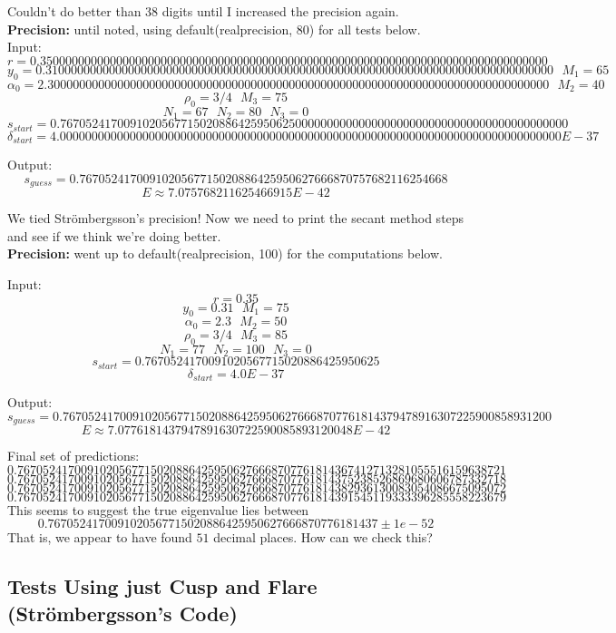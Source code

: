 \documentclass[]{article}
\begin{document}
Couldn't do better than 38 digits until I increased the precision again.
\\

\textbf{Precision:} until noted, using default(realprecision, 80) for all tests below.
\\

Input:
$$
r = 0.35000000000000000000000000000000000000000000000000000000000000000000000000000000 $$$$
y_0 = 0.31000000000000000000000000000000000000000000000000000000000000000000000000000000 ~~~ M_1 = 65 $$$$
\alpha_0 = 2.3000000000000000000000000000000000000000000000000000000000000000000000000000000 ~~~ M_2 = 40 $$$$
\rho_0 = 3/4 ~~~ M_3 = 75 $$$$
N_1 = 67 ~~~ N_2 = 80 ~~~ N_3 = 0 $$$$
s_{start} = 0.76705241700910205677150208864259506250000000000000000000000000000000000000000000 $$$$
\delta_{start} = 4.0000000000000000000000000000000000000000000000000000000000000000000000000000000 E-37
$$

Output:
$$
s_{guess} = 0.7670524170091020567715020886425950627666870757682116254668 $$$$
E \approx 7.075768211625466915 E-42
$$

We tied Str\"ombergsson's precision! Now we need to print the secant method steps and see if we think we're doing better.
\\

\textbf{Precision:} went up to default(realprecision, 100) for the computations below.

Input:
$$
r = 0.35 $$$$
y_0 = 0.31 ~~~ M_1 = 75 $$$$
\alpha_0 = 2.3 ~~~ M_2 = 50 $$$$
\rho_0 = 3/4 ~~~ M_3 = 85 $$$$
N_1 = 77 ~~~ N_2 = 100 ~~~ N_3 = 0 $$$$
s_{start} = 0.7670524170091020567715020886425950625 $$$$
\delta_{start} = 4.0 E-37
$$

Output:
$$
s_{guess} = 0.76705241700910205677150208864259506276668707761814379478916307225900858931200 $$$$
E \approx 7.0776181437947891630722590085893120048 E-42
$$

Final set of predictions:
$$
0.76705241700910205677150208864259506276668707761814367412713281055516159638721 $$$$
0.76705241700910205677150208864259506276668707761814375238526869680606787332718 $$$$
0.76705241700910205677150208864259506276668707761814382936130083054086675095072 $$$$
0.76705241700910205677150208864259506276668707761814391545119333396285558223679
$$
This seems to suggest the true eigenvalue lies between
$$
0.7670524170091020567715020886425950627666870776181437 \pm 1e-52
$$
That is, we appear to have found $51$ decimal places.
How can we check this?

\subsection*{Tests Using just Cusp and Flare (Str\"ombergsson's Code)}
\end{document}
